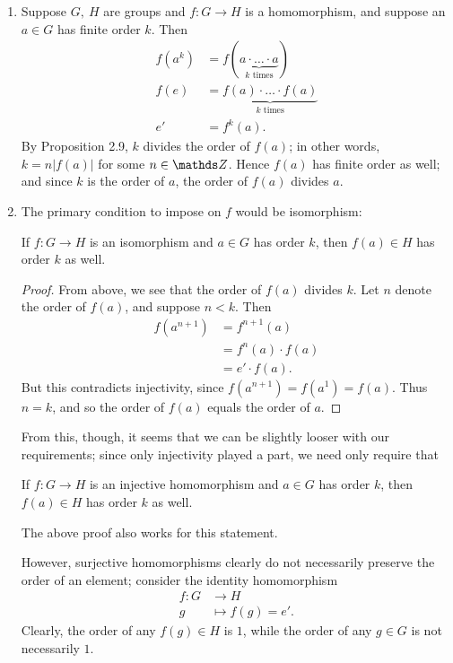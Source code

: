 \documentclass{homework}
\begin{document}
\begin{solution}
  \begin{enumerate}[label=(\alph*)]
    \item Suppose $G,\ H$ are groups and $f:G\to H$ is a homomorphism, and suppose an $a\in G$ has
      finite order $k$. Then
      \begin{align*}
        f(a^{k})&=f(\underbrace{a\cdot \ldots\cdot a}_\text{$k$ times})\\
        f(e)   &= \underbrace{f(a)\cdot \ldots\cdot f(a)}_\text{$k$ times} \\
          e'   &= f^k(a)
      .\end{align*}
      By Proposition 2.9, $k$ divides the order of $f(a)$; in other words, $k=n\left| f(a) \right| $ 
      for some $n\in \Z$. Hence $f(a)$ has finite order as well; and since $k$ is the order of $a$,
      the order of $f(a)$ divides $a$.

    \item The primary condition to impose on $f$ would be isomorphism:
      \begin{center}
        If $f:G\to H$ is an isomorphism and $a\in G$ has order $k$, then $f(a)\in H$ has order $k$
        as well.
      \end{center}
      \begin{proof}[Proof]
        From above, we see that the order of $f(a)$ divides $k$. Let $n$ denote the order of $f(a)$,
        and suppose $n<k$. Then
        \begin{align*}
          f(a^{n+1})&= f^{n+1}(a)\\
                    &= f^{n}(a)\cdot f(a) \\
                    &= e'\cdot f(a)
        .\end{align*}
        But this contradicts injectivity, since $f(a^{n+1})=f(a^{1})=f(a)$. Thus $n=k$, and so the
        order of $f(a)$ equals the order of $a$.
      \end{proof}
      From this, though, it seems that we can be slightly looser with our requirements; since only
      injectivity played a part, we need only require that \begin{center}
        If $f:G\to H$ is an injective homomorphism and $a\in G$ has order $k$, then $f(a)\in H$ has
        order $k$ as well.
      \end{center} The above proof also works for this statement.

      However, surjective homomorphisms clearly do not necessarily preserve the order of an element;
      consider the identity homomorphism \begin{align*}
        f: G &\longrightarrow H \\
        g &\longmapsto f(g) = e'
      .\end{align*} Clearly, the order of any $f(g)\in H$ is $1$, while the order of any $g\in G$ is
      not necessarily $1$.
  \end{enumerate}
\end{solution}
\end{document}
